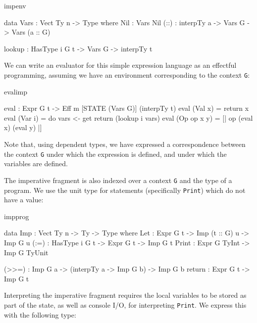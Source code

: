 \begin{SaveVerbatim}{impenv}

data Vars : Vect Ty n -> Type where
     Nil  : Vars Nil
     (::) : interpTy a -> Vars G -> Vars (a :: G)

lookup : HasType i G t -> Vars G -> interpTy t

\end{SaveVerbatim}

\noindent
We can write an evaluator for this simple expression language as an 
effectful programming, assuming we have an environment corresponding to
the context \texttt{G}:

\begin{SaveVerbatim}{evalimp}

eval : Expr G t -> Eff m [STATE (Vars G)] (interpTy t)
eval (Val x) = return x
eval (Var i) = do vars <- get
                  return (lookup i vars) 
eval (Op op x y) = [| op (eval x) (eval y) |]

\end{SaveVerbatim}

\noindent
Note that, using dependent types, we have expressed a correspondence between
the context \texttt{G} under which the expression is defined, and under which
the variables are defined.


The imperative fragment is also indexed over a context \texttt{G} and the
type of a program. We use the unit type for statements (specifically
\texttt{Print}) which do not have a value:

\begin{SaveVerbatim}{impprog}

data Imp    : Vect Ty n -> Ty -> Type where
     Let    : Expr G t -> Imp (t :: G) u -> Imp G u
     (:=)   : HasType i G t -> Expr G t -> Imp G t
     Print  : Expr G TyInt -> Imp G TyUnit

     (>>=)  : Imp G a -> 
              (interpTy a -> Imp G b) -> Imp G b 
     return : Expr G t -> Imp G t

\end{SaveVerbatim}

\noindent
Interpreting the imperative fragment requires the local variables to be
stored as part of the state, as well as console I/O, for interpreting
\texttt{Print}. We express this with the following type:

